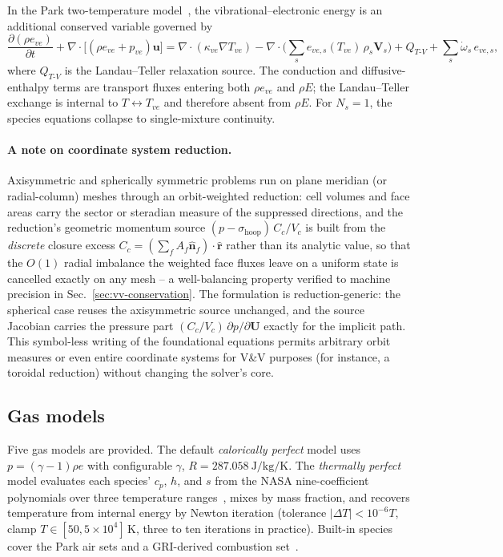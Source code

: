 \documentclass[journal,biblatex]{new-aiaa}
\newcommand{\U}{\mathbf{U}}
\newcommand{\divg}{\nabla\!\cdot\!}
\newcommand{\nhat}{\hat{\mathbf{n}}}
\begin{document}
In the Park two-temperature model~\cite{park_nonequilibrium_1989}, the vibrational--electronic energy is an additional conserved variable governed by
\begin{equation}
\frac{\partial(\rho e_{ve})}{\partial t}
+ \divg\!\big[(\rho e_{ve}+p_{ve})\mathbf{u}\big]
= \divg(\kappa_{ve}\nabla T_{ve})
 - \divg\!\Big(\sum_s e_{ve,s}(T_{ve})\,\rho_s\mathbf{V}_s\Big)
 + Q_{T\text{-}V} + \sum_s \dot\omega_s\,e_{ve,s},
\end{equation}
where $Q_{T\text{-}V}$ is the Landau--Teller relaxation source. The conduction and diffusive-enthalpy terms are transport fluxes entering both $\rho e_{ve}$ and $\rho E$; the Landau--Teller exchange is internal to $T\!\leftrightarrow\!T_{ve}$ and therefore absent from $\rho E$. For $N_s=1$, the species equations collapse to single-mixture continuity.

\paragraph{A note on coordinate system reduction.}
Axisymmetric and spherically symmetric problems run on plane meridian (or radial-column) meshes through an orbit-weighted reduction: cell volumes and face areas carry the sector or steradian measure of the suppressed directions, and the reduction's geometric momentum source $(p-\sigma_{\mathrm{hoop}})\,C_c/V_c$ is built from the \emph{discrete} closure excess $C_c=(\sum_f A_f\nhat_f)\cdot\hat{\mathbf{r}}$ rather than its analytic value, so that the $O(1)$ radial imbalance the weighted face fluxes leave on a uniform state is cancelled exactly on any mesh -- a well-balancing property verified to machine precision in Sec.~\ref{sec:vv-conservation}. The formulation is reduction-generic: the spherical case reuses the axisymmetric source unchanged, and the source Jacobian carries the pressure part $(C_c/V_c)\,\partial p/\partial\U$ exactly for the implicit path. This symbol-less writing of the foundational equations permits arbitrary orbit measures or even entire coordinate systems for V\&V purposes (for instance, a toroidal reduction) without changing the solver's core.

\subsection{Gas models}

Five gas models are provided. The default \emph{calorically perfect} model uses $p=(\gamma-1)\rho e$ with configurable $\gamma$, $R=\qty{287.058}{\J\per\kg\per\K}$. The \emph{thermally perfect} model evaluates each species' $c_p$, $h$, and $s$ from the NASA nine-coefficient polynomials over three temperature ranges~\cite{mcbride_nasa_2002,mcbride_coefficients_1993}, mixes by mass fraction, and recovers temperature from internal energy by Newton iteration (tolerance $|\Delta T|<10^{-6}T$, clamp $T\in[50,5\times10^4]\,\unit{\K}$, three to ten iterations in practice). Built-in species cover the Park air sets and a GRI-derived combustion set~\cite{gregory_p_smith_gri-mech_nodate}.
\end{document}
